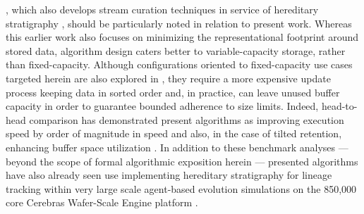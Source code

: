 
\citet{moreno2024algorithms}, which also develops stream curation techniques in service of hereditary stratigraphy \citep{moreno2022hstrat}, should be particularly noted in relation to present work.
Whereas this earlier work also focuses on minimizing the representational footprint around stored data, algorithm design caters better to variable-capacity storage, rather than fixed-capacity.
Although configurations oriented to fixed-capacity use cases targeted herein are also explored in \citet{moreno2024algorithms}, they require a more expensive update process keeping data in sorted order and, in practice, can leave unused buffer capacity in order to guarantee bounded adherence to size limits.
Indeed, head-to-head comparison has demonstrated present algorithms as improving execution speed by order of magnitude in speed and also, in the case of tilted retention, enhancing buffer space utilization \citep{moreno2024guide,moreno2024trackable}.
In addition to these benchmark analyses --- beyond the scope of formal algorithmic exposition herein --- presented algorithms have also already seen use implementing hereditary stratigraphy for lineage tracking within very large scale agent-based evolution simulations on the 850,000 core Cerebras Wafer-Scale Engine platform \citep{moreno2024trackable}.
